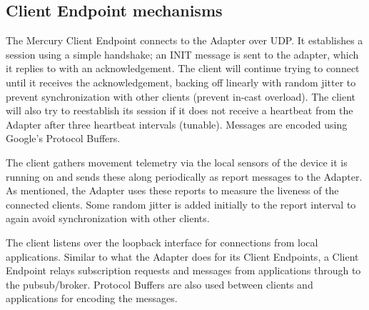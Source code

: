 %
    
\subsection{Client Endpoint mechanisms}

The Mercury Client Endpoint connects to the Adapter over UDP. It
establishes a session using a simple handshake; an INIT message is
sent to the adapter, which it replies to with an acknowledgement. The
client will continue trying to connect until it receives the
acknowledgement, backing off linearly with random jitter to prevent
synchronization with other clients (prevent in-cast overload). The
client will also try to reestablish its session if it does not receive
a heartbeat from the Adapter after three heartbeat intervals (tunable).
Messages are encoded using Google's Protocol Buffers.

The client gathers movement telemetry via the local sensors of the
device it is running on and sends these along periodically as report
messages to the Adapter.  As mentioned, the Adapter uses these reports
to measure the liveness of the connected clients.  Some random jitter
is added initially to the report interval to again avoid
synchronization with other clients.

The client listens over the loopback interface for connections from
local applications.  Similar to what the Adapter does for its Client
Endpoints, a Client Endpoint relays subscription requests and messages
from applications through to the pubsub/broker.  Protocol Buffers are
also used between clients and applications for encoding the messages.

% 
%

